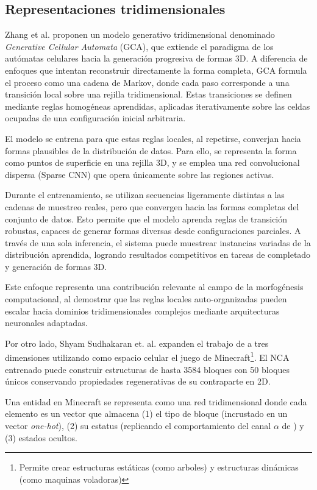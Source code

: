 \subsection{Representaciones tridimensionales}

Zhang et al. \cite{GCA} proponen un modelo generativo tridimensional denominado \textit{Generative Cellular Automata} (GCA), que extiende el paradigma de los autómatas celulares hacia la generación progresiva de formas 3D. A diferencia de enfoques que intentan reconstruir directamente la forma completa, GCA formula el proceso como una cadena de Markov, donde cada paso corresponde a una transición local sobre una rejilla tridimensional. Estas transiciones se definen mediante reglas homogéneas aprendidas, aplicadas iterativamente sobre las celdas ocupadas de una configuración inicial arbitraria.

El modelo se entrena para que estas reglas locales, al repetirse, converjan hacia formas plausibles de la distribución de datos. Para ello, se representa la forma como puntos de superficie en una rejilla 3D, y se emplea una red convolucional dispersa (Sparse CNN) que opera únicamente sobre las regiones activas.

Durante el entrenamiento, se utilizan secuencias ligeramente distintas a las cadenas de muestreo reales, pero que convergen hacia las formas completas del conjunto de datos. Esto permite que el modelo aprenda reglas de transición robustas, capaces de generar formas diversas desde configuraciones parciales. A través de una sola inferencia, el sistema puede muestrear instancias variadas de la distribución aprendida, logrando resultados competitivos en tareas de completado y generación de formas 3D.

Este enfoque representa una contribución relevante al campo de la morfogénesis computacional, al demostrar que las reglas locales auto-organizadas pueden escalar hacia dominios tridimensionales complejos mediante arquitecturas neuronales adaptadas.

Por otro lado, Shyam Sudhakaran et. al. \cite{NCA3D} expanden el trabajo de \cite{mordvintsevNCA} a tres dimensiones utilizando como espacio celular el juego de Minecraft\footnote{Permite crear estructuras estáticas (como arboles) y estructuras dinámicas (como maquinas voladoras)}. El NCA entrenado puede construir estructuras de hasta 3584 bloques con 50 bloques únicos conservando propiedades regenerativas de su contraparte en 2D.

Una entidad en Minecraft se representa como una red tridimensional donde cada elemento es un vector que almacena (1) el tipo de bloque (incrustado en un vector \textit{one-hot}), (2) su estatus (replicando el comportamiento del canal $\alpha$ de \cite{mordvintsevNCA}) y (3) estados ocultos.

